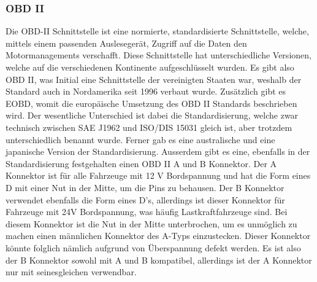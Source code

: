 \subsubsection{OBD II}
Die OBD-II Schnittstelle ist eine normierte, standardisierte Schnittstelle, welche, mittels einem passenden Auslesegerät, Zugriff auf die Daten den Motormanagements verschafft. Diese Schnittstelle hat unterschiedliche Versionen, welche auf die verschiedenen Kontinente aufgeschlüsselt wurden. Es gibt also OBD II, was Initial eine Schnittstelle der vereinigten Staaten war, weshalb der Standard auch in Nordamerika seit 1996 verbaut wurde. Zusätzlich gibt es EOBD, womit die europäische Umsetzung des OBD II Standards beschrieben wird.\cite{Directive.98/69/EC.EUParliament} Der wesentliche Unterschied ist dabei die Standardisierung, welche zwar technisch zwischen SAE J1962 und ISO/DIS 15031 gleich ist, aber trotzdem unterschiedlich benannt wurde. \cite{SAE.J1962} Ferner gab es eine australische \cite{AU.Motor.Vehicle.Standards.Act.1989} und eine japanische Version der Standardisierung.
\newline
\newline
Ausserdem gibt es eine, ebenfalls in der Standardisierung festgehalten einen OBD II A und B Konnektor. Der A Konnektor ist für alle Fahrzeuge mit 12 V Bordspannung und hat die Form eines D mit einer Nut in der Mitte, um die Pins zu behausen. Der B Konnektor verwendet ebenfalls die Form eines D's, allerdings ist dieser Konnektor für Fahrzeuge mit 24V Bordspannung, was häufig Lastkraftfahrzeuge sind. Bei diesem Konnektor ist die Nut in der Mitte unterbrochen, um es unmöglich zu machen einen männlichen Konnektor des A-Typs einzustecken. Dieser Konnektor könnte folglich nämlich aufgrund von Überspannung defekt werden. Es ist also der B Konnektor sowohl mit A und B kompatibel, allerdings ist der A Konnektor nur mit seinesgleichen verwendbar.


